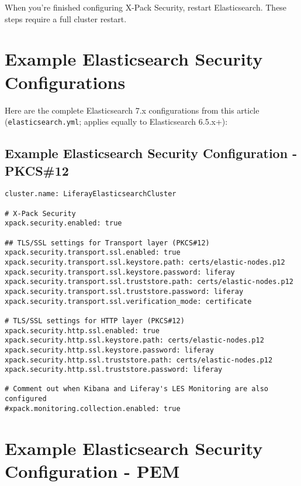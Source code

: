 When you're finished configuring X-Pack Security, restart Elasticsearch.
These steps require a full cluster restart.

\section{Example Elasticsearch Security
Configurations}\label{example-elasticsearch-security-configurations}

Here are the complete Elasticsearch 7.x configurations from this article
(\texttt{elasticsearch.yml}; applies equally to Elasticsearch 6.5.x+):

\subsection{Example Elasticsearch Security Configuration -
PKCS\#12}\label{example-elasticsearch-security-configuration---pkcs12}

\begin{verbatim}
cluster.name: LiferayElasticsearchCluster

# X-Pack Security
xpack.security.enabled: true

## TLS/SSL settings for Transport layer (PKCS#12)
xpack.security.transport.ssl.enabled: true
xpack.security.transport.ssl.keystore.path: certs/elastic-nodes.p12
xpack.security.transport.ssl.keystore.password: liferay
xpack.security.transport.ssl.truststore.path: certs/elastic-nodes.p12
xpack.security.transport.ssl.truststore.password: liferay
xpack.security.transport.ssl.verification_mode: certificate

# TLS/SSL settings for HTTP layer (PKCS#12)
xpack.security.http.ssl.enabled: true
xpack.security.http.ssl.keystore.path: certs/elastic-nodes.p12
xpack.security.http.ssl.keystore.password: liferay
xpack.security.http.ssl.truststore.path: certs/elastic-nodes.p12
xpack.security.http.ssl.truststore.password: liferay

# Comment out when Kibana and Liferay's LES Monitoring are also configured
#xpack.monitoring.collection.enabled: true
\end{verbatim}

\section{Example Elasticsearch Security Configuration -
PEM}\label{example-elasticsearch-security-configuration---pem}

